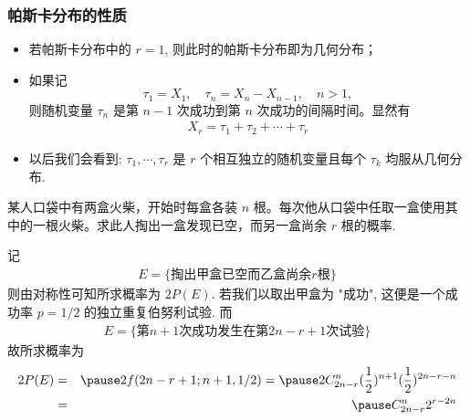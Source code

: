 \begin{frame}
	\frametitle{帕斯卡分布的性质}
	\begin{itemize}[<+-|alert@+>]
		\item 若帕斯卡分布中的 $r=1$, 则此时的帕斯卡分布即为几何分布；
		\item 如果记 $$\tau_1=X_1, \quad \tau_n=X_n-X_{n-1}, \quad n>1, $$ 则随机变量 $\tau_n$ 是第 $n-1$ 次成功到第 $n$ 次成功的间隔时间。显然有
		      \begin{eqnarray*}
			      X_r=\tau_1+\tau_2+\cdots+\tau_r
		      \end{eqnarray*}
		\item 以后我们会看到: $\tau_1,\cdots, \tau_r$ 是 $r$ 个相互独立的随机变量且每个 $\tau_k$ 均服从几何分布.
	\end{itemize}
\end{frame}

\begin{frame}
	\begin{exam}
		某人口袋中有两盒火柴，开始时每盒各装 $n$ 根。每次他从口袋中任取一盒使用其中的一根火柴。求此人掏出一盒发现已空，而另一盒尚余 $r$ 根的概率.
	\end{exam}

	\pause
	\jieda 记
	\begin{eqnarray*}
		E=\{\mbox{掏出甲盒已空而乙盒尚余} r\mbox{根}\}
	\end{eqnarray*}
	\pause 则由对称性可知所求概率为 $2P (E)$. \pause 若我们以取出甲盒为 "成功", 这便是一个成功率 $p=1/2$ 的独立重复伯努利试验.
	\pause 而
	\begin{eqnarray*}
		E=\{\mbox{第} n+1\mbox{次成功发生在第} 2n-r+1\mbox{次试验}\}
	\end{eqnarray*}
	\pause 故所求概率为
	\begin{eqnarray*}
		2P(E)&=&\pause 2f(2n-r+1;n+1,1/2)=\pause 2C_{2n-r}^n(\dfrac{1}{2})^{n+1}(\dfrac{1}{2})^{2n-r-n}\\
		&=&\pause C_{2n-r}^n2^{r-2n}
	\end{eqnarray*}

\end{frame}



